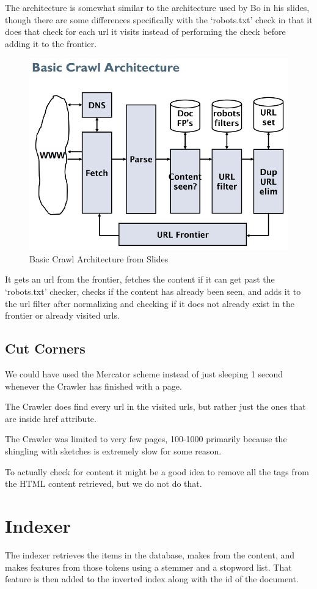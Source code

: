 	The architecture is somewhat similar to the architecture used by Bo in his slides, though there are some differences specifically with the `robots.txt' check in that it does that check for each url it visits instead of performing the check before adding it to the frontier.
	
	\begin{figure}[H]
	\centering
	\includegraphics[width=0.7\linewidth]{./Media/basiccrawlarchitecture}
	\caption{Basic Crawl Architecture from Slides}
	\label{fig:basiccrawlarchitecture}
	\end{figure}
	
	It gets an url from the frontier, fetches the content if it can get past the `robots.txt' checker, checks if the content has already been seen, and adds it to the url filter after normalizing and checking if it does not already exist in the frontier or already visited urls.
	
	\subsection{Cut Corners}
	We could have used the Mercator scheme instead of just sleeping 1 second whenever the Crawler has finished with a page.
	
	The Crawler does find every url in the visited urls, but rather just the ones that are inside href attribute.
	
	The Crawler was limited to very few pages, 100-1000 primarily because the shingling with sketches is extremely slow for some reason.
	
	To actually check for content it might be a good idea to remove all the tags from the HTML content retrieved, but we do not do that.
	
	\section{Indexer}
	The indexer retrieves the items in the database, makes from the content, and makes features from those tokens using a stemmer and a stopword list. That feature is then added to the inverted index along with the id of the document.
	
